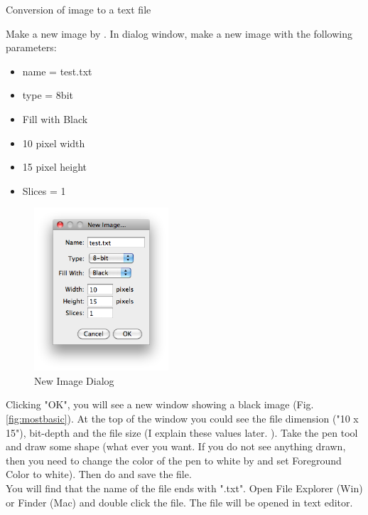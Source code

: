 \begin{indentexercise}{1}
\label{exer:1111}
\item Conversion of image to a text file
\item Make a new image by . In dialog window,
make a new image with the following parameters:

\begin{itemize}
\item name = test.txt
\item type = 8bit
\item Fill with Black
\item 10 pixel width
\item 15 pixel height
\item Slices = 1
\end{itemize}


\begin{figure}[htbp]
\begin{center}
\includegraphics[width=5cm]{fig/CMCIBasicCourse201102-img1.png}
\caption{ New Image Dialog}
\label{fig:img1}
\end{center}
\end{figure}
Clicking "OK", you will see a new window showing a black image (Fig.
\ref{fig:mostbasic}). At the top of the window you could see the file dimension ("10 x 15"), 
bit-depth and the file size (I explain these values later.
). Take the pen tool and draw some shape (what ever you want. 
If you do not see anything drawn, then you need to change the color of the pen to white by 
 and set Foreground Color to white). 
Then do  and save the file. \\

You will find that the name of the file ends with ".txt". 
Open File Explorer (Win) or Finder (Mac) and double click the file. 
The file will be opened in text editor.


\end{indentexercise}
